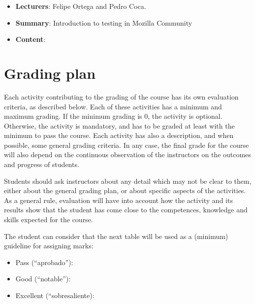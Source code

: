 \documentclass[a4paper]{article}
\begin{document}
\begin{itemize}
 \item \textbf{Lecturers}: Felipe Ortega and Pedro Coca.
 \item \textbf{Summary}: Introduction to testing in Mozilla Community
 \item \textbf{Content}:

   

\end{itemize}

\section{Grading plan}

Each activity contributing to the grading of the course has its own evaluation criteria, as described below. Each of these activities has a minimum and maximum grading. If the minimum grading is 0, the activity is optional. Otherwise, the activity is mandatory, and has to be graded at least with the minimum to pass the course. Each activity has also a description, and when possible, some general grading criteria. In any case, the final grade for the course will also depend on the continuous observation of the instructors on the outcomes and progress of students.

Students should ask instructors about any detail which may not be clear to them, either about the general grading plan, or about specific aspects of the activities. As a general rule, evaluation will have into account how the activity and its results show that the student has come close to the competences, knowledge and skills expected for the course.

The student can consider that the next table will be used as a (minimum) guideline for assigning marks:

\begin{itemize}
\item Pass (``aprobado''): 
\item Good (``notable''): 
\item Excellent (``sobresaliente): 
\end{itemize}
\end{document}
